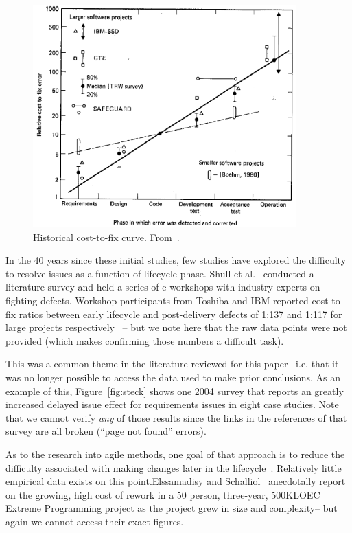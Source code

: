 \documentclass[smallcondesed]{svjour3}
\newcommand{\fig}[1]{Figure~\ref{fig:#1}}
\begin{document}
\begin{figure}[!b]
\begin{center}\includegraphics[width=4in]{img/boehm_cost-to-fix.png}\end{center}
 \caption{Historical cost-to-fix curve. From~\cite{Boehm81}.}\label{fig:cost-to-fix}
 \end{figure}
 
In the 40 years since these initial studies, few studies have explored the difficulty to resolve issues
as a function of lifecycle phase. 
Shull et al.~\cite{Shull02} conducted a literature survey and held a series of e-workshops with industry experts on fighting defects. Workshop participants from Toshiba and IBM reported cost-to-fix ratios between early lifecycle and post-delivery defects of 1:137 and 1:117 for large projects respectively~\cite{Shull02} -- but we note here that the raw data points were not provided (which makes confirming those numbers 
a difficult task). 

This was a common theme in the literature reviewed for this paper-- i.e.  that  it was no longer possible to access
the data used to make prior conclusions.
As an example of this, \fig{steck} shows one 2004 survey that reports an 
greatly increased delayed issue  effect for 
requirements issues in eight case studies. Note that we cannot verify
{\em any} of those results since the links in the references of
that  survey are all broken (``page not found'' errors).


As to the research into agile methods, one goal of that approach
is to reduce the difficulty associated with making changes later in the lifecycle~\cite{beck00}. Relatively little empirical data exists on this point.Elssamadisy and Schalliol~\cite{Elssamadisy02} anecdotally report on the growing, high cost of rework in a 50 person, three-year, 500KLOEC Extreme Programming project as the project grew in size and complexity-- but again we cannot access their 
exact figures.
\end{document}
